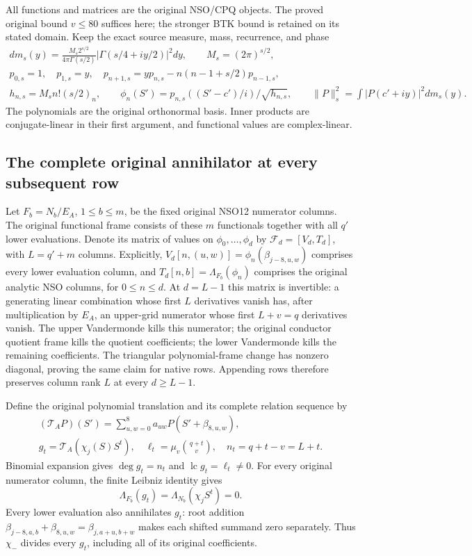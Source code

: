 \documentclass[11pt,a4paper]{article}
\begin{document}
All functions and matrices are the original NSO/CPQ objects. The
proved original bound $v\le80$ suffices here; the stronger BTK
bound is retained on its stated domain. Keep the exact source
measure, mass, recurrence, and phase
\[
\begin{gathered}
 dm_s(y)=\frac{M_s2^{s/2}}{4\pi\Gamma(s/2)}
                  |\Gamma(s/4+iy/2)|^2dy,\qquad M_s=(2\pi)^{s/2},\\
 p_{0,s}=1,\quad p_{1,s}=y,\quad
 p_{n+1,s}=yp_{n,s}-n(n-1+s/2)p_{n-1,s},\\
 h_{n,s}=M_sn!(s/2)_n,\qquad
 \phi_n(S')=p_{n,s}((S'-c')/i)/\sqrt{h_{n,s}},\qquad
 \|P\|_s^2=\int|P(c'+iy)|^2dm_s(y).
\end{gathered}                                                     \tag{NIB2}
\]
The polynomials are the original orthonormal basis. Inner products
are conjugate-linear in their first argument, and functional values
are complex-linear.

\subsection{The complete original annihilator at every subsequent row}
Let $F_b=N_b/E_A$, $1\le b\le m$, be the fixed original NSO12
numerator columns. The original functional frame consists of these
$m$ functionals together with all $q'$ lower evaluations. Denote
its matrix of values on $\phi_0,\ldots,\phi_d$ by
$\mathcal F_d=[V_d,T_d]$, with $L=q'+m$ columns. Explicitly,
$V_d[n,(u,w)]=\phi_n(\beta_{j-8,u,w})$ comprises every lower
evaluation column, and $T_d[n,b]=\Lambda_{F_b}(\phi_n)$ comprises
the original analytic NSO columns, for $0\le n\le d$.
At $d=L-1$
this matrix is invertible: a generating linear combination whose
first $L$ derivatives vanish has, after multiplication by $E_A$,
an upper-grid numerator whose first $L+v=q$ derivatives vanish.
The upper Vandermonde kills this numerator; the original conductor
quotient frame kills the quotient coefficients; the lower
Vandermonde kills the remaining coefficients. The triangular
polynomial-frame change has nonzero diagonal, proving the same
claim for native rows. Appending rows therefore preserves column
rank $L$ at every $d\ge L-1$.

Define the original polynomial translation and its complete relation
sequence by
\[
\begin{gathered}
 (\mathcal T_AP)(S')=\sum_{u,w=0}^8a_{uw}P(S'+\beta_{8,u,w}),\\
 g_t=\mathcal T_A(\chi_j(S)S^t),\quad
 \ell_t=\mu_v\binom{q+t}{v},\quad n_t=q+t-v=L+t.
\end{gathered}                                                     \tag{NIB3}
\]
Binomial expansion gives $\deg g_t=n_t$ and
$\operatorname{lc}g_t=\ell_t\ne0$. For every original numerator
column, the finite Leibniz identity gives
\[
 \Lambda_{F_b}(g_t)=\Lambda_{N_b}(\chi_j S^t)=0.
\]
Every lower evaluation also annihilates $g_t$: root addition
$\beta_{j-8,a,b}+\beta_{8,u,w}=\beta_{j,a+u,b+w}$ makes
each shifted summand zero separately. Thus $\chi_-$ divides
every $g_t$, including all of its original coefficients.
\end{document}
